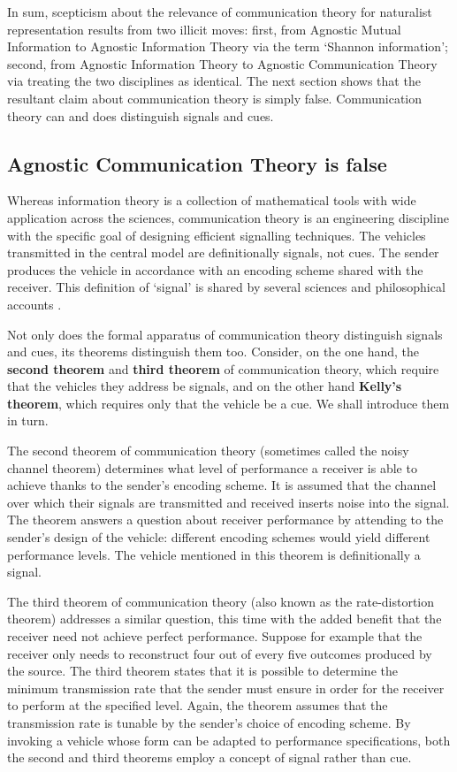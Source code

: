 In sum, scepticism about the relevance of communication theory for naturalist representation results from two illicit moves: first, from {\sc Agnostic Mutual Information} to {\sc Agnostic Information Theory} via the term `Shannon information'; second, from {\sc Agnostic Information Theory} to {\sc Agnostic Communication Theory} via treating the two disciplines as identical.
The next section shows that the resultant claim about communication theory is simply false.
Communication theory can and does distinguish signals and cues.


\subsection{{\sc Agnostic Communication Theory} is false}

Whereas information theory is a collection of mathematical tools with wide application across the sciences, communication theory is an engineering discipline with the specific goal of designing efficient signalling techniques.
The vehicles transmitted in the central model are definitionally signals, not cues.
The sender produces the vehicle in accordance with an encoding scheme shared with the receiver.
This definition of `signal' is shared by several sciences \citep{shannon1948mathematicala,maynardsmith2003animal} and philosophical accounts \citep[$\S$6]{millikan2004varieties} \citep{bergstrom2011transmission}.

Not only does the formal apparatus of communication theory distinguish signals and cues, its theorems distinguish them too.
Consider, on the one hand, the \textbf{second theorem} and \textbf{third theorem} of communication theory, which require that the vehicles they address be signals, and on the other hand \textbf{Kelly's theorem}, which requires only that the vehicle be a cue.
We shall introduce them in turn.

The second theorem of communication theory (sometimes called the noisy channel theorem) determines what level of performance a receiver is able to achieve thanks to the sender's encoding scheme.
It is assumed that the channel over which their signals are transmitted and received inserts noise into the signal.
The theorem answers a question about receiver performance by attending to the sender's design of the vehicle: different encoding schemes would yield different performance levels.
The vehicle mentioned in this theorem is definitionally a signal.

The third theorem of communication theory (also known as the rate-distortion theorem) addresses a similar question, this time with the added benefit that the receiver need not achieve perfect performance.
Suppose for example that the receiver only needs to reconstruct four out of every five outcomes produced by the source.
The third theorem states that it is possible to determine the minimum transmission rate that the sender must ensure in order for the receiver to perform at the specified level.
Again, the theorem assumes that the transmission rate is tunable by the sender's choice of encoding scheme.
By invoking a vehicle whose form can be adapted to performance specifications, both the second and third theorems employ a concept of signal rather than cue.

